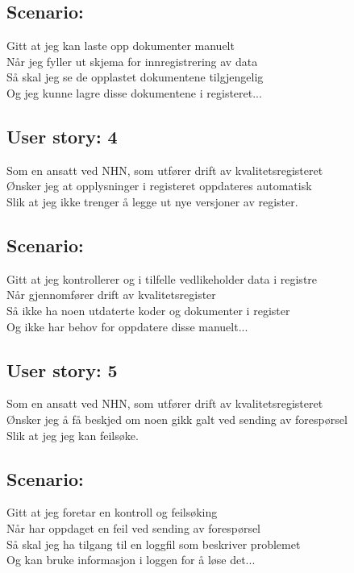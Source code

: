 \subsection*{Scenario:}
Gitt at jeg kan laste opp dokumenter manuelt\\
Når jeg fyller ut skjema for innregistrering av data\\
Så skal jeg se de opplastet dokumentene tilgjengelig\\
Og jeg kunne lagre disse dokumentene i registeret...\\

\subsection{User story: 4}
Som en ansatt ved NHN, som utfører drift av kvalitetsregisteret\\
Ønsker jeg at opplysninger i registeret oppdateres automatisk\\
Slik at jeg ikke trenger å legge ut nye versjoner av register.\\

\subsection*{Scenario:}
Gitt at jeg kontrollerer og i tilfelle vedlikeholder data i registre\\
Når gjennomfører drift av kvalitetsregister\\
Så ikke ha noen utdaterte koder og dokumenter i register\\
Og ikke har behov for oppdatere disse manuelt...\\

\subsection{User story: 5}
Som en ansatt ved NHN, som utfører drift av kvalitetsregisteret\\
Ønsker jeg å få beskjed om noen gikk galt ved sending av forespørsel\\
Slik at jeg jeg kan feilsøke.\\

\subsection*{Scenario:}
Gitt at jeg foretar en kontroll og feilsøking\\
Når har oppdaget en feil ved sending av forespørsel\\
Så skal jeg ha tilgang til en loggfil som beskriver problemet\\
Og kan bruke informasjon i loggen for å løse det...\\


